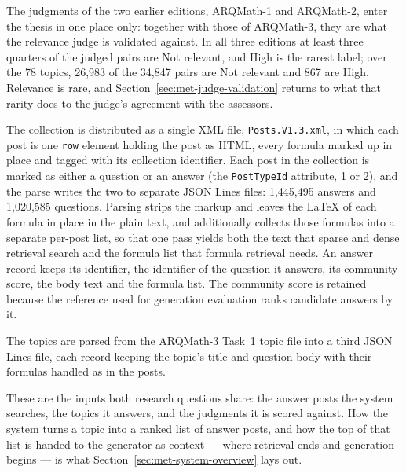 The judgments of the two earlier editions, ARQMath-1 and ARQMath-2, enter the
thesis in one place only: together with those of ARQMath-3, they are what the
relevance judge is validated against. In all three editions at least three quarters
of the judged pairs are Not relevant, and High is the rarest label; over the 78
topics, 26{,}983 of the 34{,}847 pairs are Not relevant and 867 are High.
Relevance is rare, and Section~\ref{sec:met-judge-validation} returns to what that
rarity does to the judge's agreement with the assessors.

The collection is distributed as a single XML file, \texttt{Posts.V1.3.xml}, in
which each post is one \texttt{row} element holding the post as HTML, every formula
marked up in place and tagged with its collection identifier. Each post in the
collection is marked as either a question or an answer (the \texttt{PostTypeId}
attribute, 1 or 2), and the parse writes the two to separate JSON Lines files:
1{,}445{,}495 answers and 1{,}020{,}585 questions. Parsing strips the markup and
leaves the \LaTeX{} of each formula in place in the plain text, and additionally
collects those formulas into a separate per-post list, so that one pass yields both
the text that sparse and dense retrieval search and the formula list that formula
retrieval needs. An answer record keeps its identifier, the identifier of the
question it answers, its community score, the body text and the formula list. The
community score is retained because the reference used for generation evaluation
ranks candidate answers by it.

The topics are parsed from the ARQMath-3 Task~1 topic file into a third JSON Lines
file, each record keeping the topic's title and question body with their formulas
handled as in the posts.

These are the inputs both research questions share: the answer posts the system
searches, the topics it answers, and the judgments it is scored against. How the
system turns a topic into a ranked list of answer posts, and how the top of that
list is handed to the generator as context --- where retrieval ends and generation
begins --- is what Section~\ref{sec:met-system-overview} lays out.


